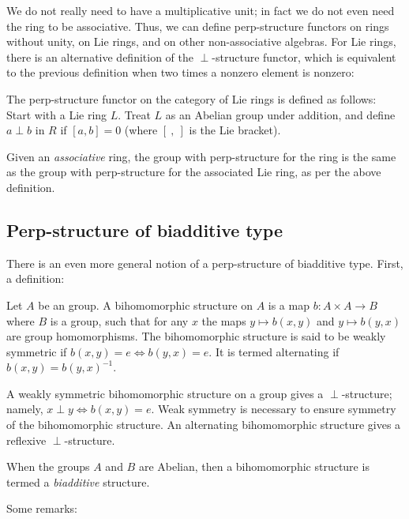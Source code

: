 \documentclass[a4paper]{amsart}
\begin{document}
We do not really need to have a multiplicative unit; in fact we do not
even need the ring to be associative. Thus, we can define
perp-structure functors on rings without unity, on Lie rings, and on
other non-associative algebras. For Lie rings, there is an alternative
definition of the $\perp$-structure functor, which is equivalent to
the previous definition when two times a nonzero element is nonzero:

\begin{definer}
  The perp-structure functor on the category of Lie rings is defined
  as follows: Start with a Lie ring $L$. Treat $L$ as an Abelian group
  under addition, and define $a \perp b$ in $R$ if $[a,b]=0$ (where
  $[\ ,\ ]$ is the Lie bracket).
\end{definer}

Given an {\em associative} ring, the group with perp-structure for the
ring is the same as the group with perp-structure for the associated
Lie ring, as per the above definition.

\subsection{Perp-structure of biadditive type}

There is an even more general notion of a perp-structure of biadditive
type. First, a definition:

\begin{definer}
  Let $A$ be an group. A bihomomorphic structure on $A$ is a map $b:A
  \times A \to B$ where $B$ is a group, such that for any $x$ the maps
  $y \mapsto b(x,y)$ and $y \mapsto b(y,x)$ are group
  homomorphisms. The bihomomorphic structure is said to be weakly
  symmetric if $b(x,y) = e \iff b(y,x) = e$. It is termed
  alternating if $b(x,y) = b(y,x)^{-1}$.
\end{definer}

A weakly symmetric bihomomorphic structure on a group gives a
$\perp$-structure; namely, $x \perp y \iff b(x,y) = e$. Weak symmetry
is necessary to ensure symmetry of the bihomomorphic structure. An
alternating bihomomorphic structure gives a reflexive
$\perp$-structure.

When the groups $A$ and $B$ are Abelian, then a bihomomorphic
structure is termed a {\em biadditive} structure.

Some remarks:
\end{document}

